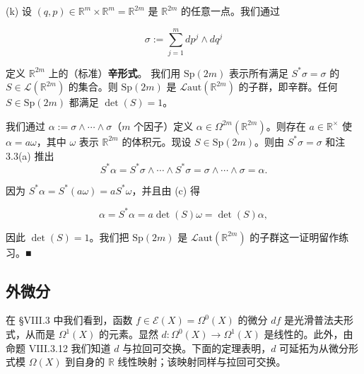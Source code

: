 \begin{example}
(k) 设 $ (q, p) \in \mathbb{R}^{m} \times \mathbb{R}^{m} = \mathbb{R}^{2m} $ 是 $ \mathbb{R}^{2m} $ 的任意一点。我们通过

\[
\sigma := \sum_{j=1}^{m} dp^{j} \wedge dq^{j}
\]

定义 $ \mathbb{R}^{2m} $ 上的（标准）\textbf{辛形式}。
我们用 $ \mathrm{Sp}(2m) $ 表示所有满足 $ S^{*}\sigma = \sigma $ 的 $ S \in \mathcal{L}(\mathbb{R}^{2m}) $ 的集合。则 $ \mathrm{Sp}(2m) $ 是 $ \mathcal{L}\mathrm{aut}(\mathbb{R}^{2m}) $ 的子群，即辛群。任何 $ S \in \mathrm{Sp}(2m) $ 都满足 $ \det(S) = 1 $。

\proofhead
我们通过 $ \alpha := \sigma \wedge \cdots \wedge \sigma $（$ m $ 个因子）定义 $ \alpha \in \Omega^{2m}(\mathbb{R}^{2m}) $。则存在 $ a \in \mathbb{R}^{\times} $ 使 $ \alpha = a\omega $，其中 $ \omega $ 表示 $ \mathbb{R}^{2m} $ 的体积元。现设 $ S \in \mathrm{Sp}(2m) $。则由 $ S^{*}\sigma = \sigma $ 和注 3.3(a) 推出
\[
S^{*}\alpha = S^{*}\sigma \wedge \cdots \wedge S^{*}\sigma = \sigma \wedge \cdots \wedge \sigma = \alpha.
\]

因为 $ S^{*}\alpha = S^{*}(a\omega) = aS^{*}\omega $，并且由 (c) 得

\[
\alpha = S^{*}\alpha = a\det(S)\omega = \det(S)\alpha,
\]

因此 $ \det(S) = 1 $。我们把 $ \mathrm{Sp}(2m) $ 是 $ \mathcal{L}\mathrm{aut}(\mathbb{R}^{2m}) $ 的子群这一证明留作练习。\nobreak\hspace{0.35em}■

\end{example}

\subsection*{外微分}

在 §VIII.3 中我们看到，函数 $ f \in \mathcal{E}(X) = \Omega^{0}(X) $ 的微分 $ df $ 是光滑普法夫形式，从而是 $ \Omega^{1}(X) $ 的元素。显然 $ d: \Omega^{0}(X) \to \Omega^{1}(X) $ 是线性的。此外，由命题 VIII.3.12 我们知道 $ d $ 与拉回可交换。下面的定理表明，$ d $ 可延拓为从微分形式模 $ \Omega(X) $ 到自身的 $ \mathbb{R} $ 线性映射；该映射同样与拉回可交换。

